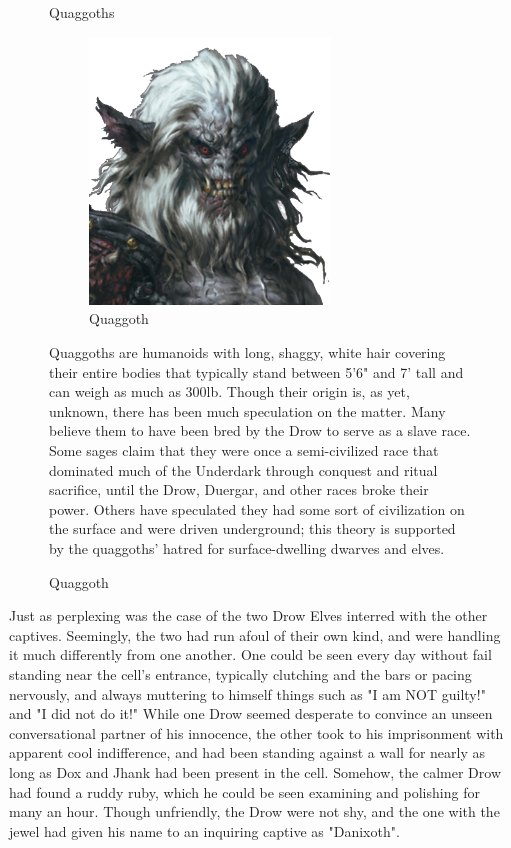 \documentclass[letterpaper,10pt,twoside,twocolumn,openany]{book}
\begin{document}
\begin{figure}[h]
	\begin{paperbox}{Quaggoths}
		\begin{figure}[H]
			\centering
			\includegraphics[width=0.7\textwidth]{img/dist/quaggoth.png}
			\caption{Quaggoth\label{fig:quaggoth}}
		\end{figure}
		Quaggoths are humanoids with long, shaggy, white hair covering their entire bodies that typically stand between 5'6" and 7' tall and can weigh as much as 300lb. Though their origin is, as yet, unknown, there has been much speculation on the matter. Many believe them to have been bred by the Drow to serve as a slave race. Some sages claim that they were once a semi-civilized race that dominated much of the Underdark through conquest and ritual sacrifice, until the Drow, Duergar, and other races broke their power. Others have speculated they had some sort of civilization on the surface and were driven underground; this theory is supported by the quaggoths' hatred for surface-dwelling dwarves and elves.
	\end{paperbox}
\end{figure}

Just as perplexing was the case of the two Drow Elves interred with the other captives. Seemingly, the two had run afoul of their own kind, and were handling it much differently from one another. One could be seen every day without fail standing near the cell's entrance, typically clutching and the bars or pacing nervously, and always muttering to himself things such as "I am NOT guilty!" and "I did not do it!" While one Drow seemed desperate to convince an unseen conversational partner of his innocence, the other took to his imprisonment with apparent cool indifference, and had been standing against a wall for nearly as long as Dox and Jhank had been present in the cell. Somehow, the calmer Drow had found a ruddy ruby, which he could be seen examining and polishing for many an hour. Though unfriendly, the Drow were not shy, and the one with the jewel had given his name to an inquiring captive as "Danixoth".
\end{document}
